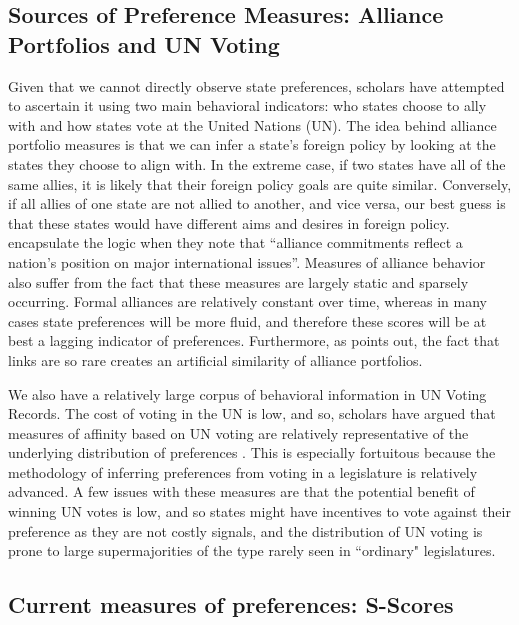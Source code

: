 \subsection*{Sources of Preference Measures: Alliance Portfolios and UN Voting}

Given that we cannot directly observe state preferences, scholars have attempted to ascertain it using two main behavioral indicators: who states choose to ally with and how states vote at the United Nations (UN). The idea behind alliance portfolio measures is that we can infer a state's foreign policy by looking at the states they choose to align with. In the extreme case, if two states have all of the same allies, it is likely that their foreign policy goals are quite similar. Conversely, if all allies of one state are not allied to another, and vice versa, our best guess is that these states would have different aims and desires in foreign policy. \citet{buenodemesquita:lalman:2008} encapsulate the logic when they note that ``alliance commitments reflect a nation's position on major international issues''. Measures of alliance behavior also suffer from the fact that these measures are largely static and sparsely occurring. Formal alliances are relatively constant over time, whereas in many cases state preferences will be more fluid, and therefore these scores will be at best a lagging indicator of preferences. Furthermore, as \citet{hage:2011} points out, the fact that links are so rare creates an artificial similarity of alliance portfolios.

We also have a relatively large corpus of behavioral information in UN Voting Records. The cost of voting in the UN is low, and so, scholars have argued that measures of affinity based on UN voting are relatively representative of the underlying distribution of preferences \citep{gartzke:1998}. This is especially fortuitous because the methodology of inferring preferences from voting in a legislature is relatively advanced. A few issues with these measures are that the potential benefit of winning UN votes is low, and so states might have incentives to vote against their preference as they are not costly signals, and the distribution of UN voting is prone to large supermajorities of the type rarely seen in ``ordinary" legislatures.

\subsection*{Current measures of preferences: S-Scores}

